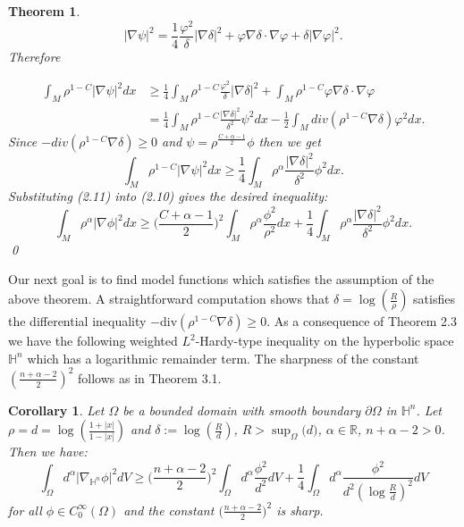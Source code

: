 \documentclass[12pt]{amsart}
\numberwithin{equation}{section}
\newtheorem{theorem}{Theorem}
\numberwithin{theorem}{section}
\numberwithin{theorem}{section} \numberwithin{lemma}{section}
\numberwithin{definition}{section}
\newtheorem{corollary}{Corollary}
\numberwithin{corollary}{section}
\numberwithin{remark}{section}
\numberwithin{proposition}{section}
\begin{document}
\begin{theorem}
\[|\nabla\psi|^2=\frac{1}{4}\frac{\varphi^2}{\delta}|\nabla
\delta|^2+\varphi \nabla\delta\cdot \nabla\varphi+\delta|\nabla
\varphi|^2.\] Therefore

\[
\begin{aligned}\int_M \rho^{1-C}|\nabla\psi|^2dx &\ge
\frac{1}{4}\int_M \rho^{1-C}\frac{\varphi^2}{\delta}|\nabla
\delta|^2+\int_M
\rho^{1-C}\varphi \nabla\delta\cdot \nabla\varphi\\
&= \frac{1}{4}\int_M \rho^{1-C}\frac{|\nabla \delta|^2}{\delta^2}
\psi^2dx-\frac{1}{2}\int_M div (\rho^{1-C}\nabla
\delta)\varphi^2dx.\end{aligned}\] Since $-div(\rho^{1-C}\nabla
\delta)\ge 0$  and $\psi=\rho^{\frac{C+\alpha-1}{2}}\phi$  then we
get
\begin{equation} \int_M \rho^{1-C}|\nabla\psi|^2dx \ge
\frac{1}{4}\int_M \rho^{\alpha}\frac{|\nabla \delta|^2}{\delta^2}
\phi^2dx.\end{equation} Substituting (2.11) into (2.10) gives the
desired inequality: \[\int_M\rho^{\alpha}|\nabla\phi|^2dx\ge
\Big(\frac{C+\alpha-1}{2}\Big)^2\int_M\rho^{\alpha}\frac{\phi^2}{\rho^2}dx+\frac{1}{4}\int_M\rho^{\alpha}\frac{|\nabla
\delta|^2}{\delta^2}\phi^2 dx.\] \qed
\end{theorem}
\medskip

Our next goal is to find model functions which satisfies the
assumption of the above theorem. A straightforward computation
shows that $\delta=\log(\frac{R}{\rho})$ satisfies the
differential inequality $-\text{div}(\rho^{1-C}\nabla \delta)\ge
0$. As a consequence of Theorem 2.3 we have the following
weighted $L^2$-Hardy-type inequality on the hyperbolic space
$\mathbb{H}^n$ which has a logarithmic remainder term. The sharpness of the constant $(\frac{n+\alpha-2}{2})^2$ follows as in \cite{Kombe-Ozaydin} Theorem 3.1.
\medskip

\begin{corollary} Let $\Omega$ be a bounded domain with smooth boundary $\partial\Omega$ in $\mathbb{H}^n$.
 Let $\rho=d=\log(\frac{1+|x|}{1-|x|})$ and $\delta:=\log(\frac{R}{d})$, $R> \sup_{\Omega}\big(d\big)$, $\alpha\in \mathbb{R}$,
$n+\alpha-2>0$. Then we have:
\begin{equation}\int_{\Omega} d^{\alpha}|\nabla_{\mathbb{H}^n} \phi|^2dV
\ge \Big(\frac{n+\alpha-2}{2}\Big)^2 \int_{\Omega}
d^{\alpha}\frac{\phi^2}{d^2}dV+\frac{1}{4}\int_{\Omega}d^{\alpha}\frac{\phi^2}{d^2(\log\frac{R}{d})^2}dV\end{equation}
for all  $\phi\in C_0^{\infty}(\Omega)$ and the constant
$\big(\frac{n+\alpha-2}{2}\big)^2$ is sharp.
\end{corollary}
\medskip
\end{document}
